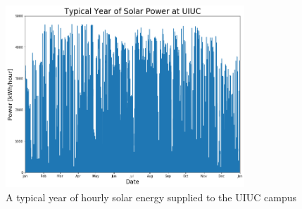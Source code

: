 \begin{figure}
  \centering
  \includegraphics[width=0.8\textwidth]{typicalsolar}
  \caption{A typical year of hourly solar energy supplied to the UIUC campus}
  \label{fig:typsol}
\end{figure}


